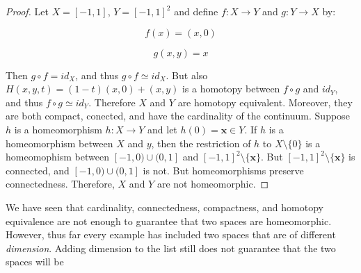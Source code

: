 \documentclass[crop=false,class=book,oneside]{standalone}
\begin{document}
            \begin{proof}
                Let $X=[-1,1]$, $Y=[-1,1]^{2}$ and define
                $f:X\rightarrow{Y}$ and $g:Y\rightarrow{X}$ by:
                \par
                \begin{minipage}[b]{0.49\textwidth}
                    \centering
                    \begin{equation}
                        f(x)=(x,0)
                    \end{equation}
                \end{minipage}
                \hfill
                \begin{minipage}[b]{0.49\textwidth}
                    \centering
                    \begin{equation}
                        g(x,y)=x
                    \end{equation}
                \end{minipage}
                \par\hfill\par
                Then $g\circ{f}=id_{X}$, and thus
                $g\circ{f}\simeq{id_{X}}$. But also
                $H(x,y,t)=(1-t)(x,0)+(x,y)$ is a homotopy
                between $f\circ{g}$ and $id_{Y}$, and thus
                $f\circ{g}\simeq{id_{Y}}$. Therefore $X$ and $Y$
                are homotopy equivalent. Moreover, they are both
                compact, conected, and have the cardinality
                of the continuum.
                Suppose $h$ is a homeomorphism $h:X\rightarrow{Y}$ and
                let $h(0)=\mathbf{x}\in{Y}$. If $h$ is a homeomorphism
                between $X$ and $y$, then the restriction of
                $h$ to $X\setminus\{0\}$ is a homeomophism
                between $[-1,0)\cup(0,1]$ and
                $[-1,1]^{2}\setminus\{\mathbf{x}\}$. But
                $[-1,1]^{2}\setminus\{\mathbf{x}\}$ is connected,
                and $[-1,0)\cup(0,1]$ is not. But homeomorphisms
                preserve connectedness. Therefore, $X$ and
                $Y$ are not homeomorphic.
            \end{proof}
            We have seen that cardinality, connectedness,
            compactness, and homotopy equivalence are not enough to
            guarantee that two spaces are homeomorphic. However, thus far
            every example has included two spaces that are of
            different \textit{dimension}. Adding dimension to the list
            still does not guarantee that the two spaces will be
\end{document}
